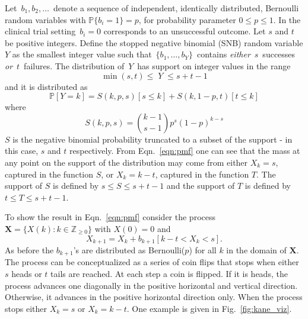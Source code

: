 \documentclass[12pt]{article}         %
\begin{document}
Let $\,b_1, b_2, \ldots \,$ denote a sequence of independent, identically 
distributed, Bernoulli random variables with $\mathbb{P}\{b_i=1\}=p$, for 
probability parameter $0\leq p \leq 1$. In the clinical trial setting 
$\,b_i = 0$ corresponds to an unsuccessful outcome.  Let $s$ and $t$ be 
positive integers.  Define the stopped negative binomial (SNB) random 
variable $Y$ as the smallest 
integer value such that $\,\{b_1, \ldots , b_Y\}\,$ contains {\em either} 
$\,s\,$ successes {\em or} $\,t\,$ failures. The distribution of $\,Y\,$ has 
support on integer values in the range 
\begin{equation*}                                     %
     \min(s,t) \leq \; Y \;\leq s+t-1  \label{range.y.eq}
\end{equation*}
and it is distributed as
\begin{equation} \label{eqn:pmf}
\mathbb{P}[Y=k] = S(k, p, s)\left[s \leq k\right] + 
  S(k, 1-p, t) \left[ t \leq k \right]
\end{equation}
where 
\begin{equation} \label{eqn:N}
S(k, p, s) = {k-1 \choose s-1} p^s (1-p)^{k-s} 
\end{equation}
$S$ is the negative binomial probability truncated to a subset of the support 
- in this case, $s$ and $t$ respectively.
From Eqn.~\ref{eqn:pmf} one can see that the mass at 
any point on the support of the distribution may come from either 
$X_k = s$, captured in the function $S$, or $X_k = k-t$, captured in the 
function $T$. The support of 
$S$ is defined by $s \leq S \leq s+t-1$ and the support of $T$ is defined 
by $t \leq T \leq s+t-1$.



To show the result in Eqn.~\ref{eqn:pmf} consider the 
process $\mathbf{X} = \{X(k) : k \in \mathbb{Z}_{\ge 0} \}$ with $X(0)=0$ and
\begin{equation*} \label{eqn:proc}
X_{k+1} = X_k + b_{k+1} \left[ k-t < X_k < s \right].
\end{equation*}
As before the $b_{k+1}$'s are distributed as Bernoulli($p$) for all $k$ in the 
domain of $\mathbf{X}$. The process can be conceptualized as a series of coin 
flips that stops when either $s$ heads or $t$ tails are reached. At each step 
a coin is flipped. If it is heads, the process advances one diagonally in the 
positive horizontal and vertical direction. Otherwise, it advances in the 
positive horizontal direction only. When the process stops
either $X_k = s$ or $X_k = k-t$. One example is given in 
Fig.~\ref{fig:kane_viz}.
\end{document}
